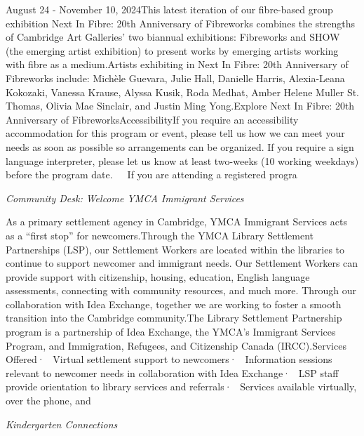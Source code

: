 \documentclass[letterpaper, 10pt]{article}
\newcommand{\subtitle}[1]{\textit{\large #1}\vspace{0.5em}}
\newcommand{\articlecontent}[1]{\small #1\vspace{1em}}
\begin{document}
\begin{multicols}{2}
{August 24 - November 10, 2024This latest iteration of our fibre-based group exhibition Next In Fibre: 20th Anniversary of Fibreworks combines the strengths of Cambridge Art Galleries’ two biannual exhibitions: Fibreworks and SHOW (the emerging artist exhibition) to present works by emerging artists working with fibre as a medium.Artists exhibiting in Next In Fibre: 20th Anniversary of Fibreworks include: Michèle Guevara, Julie Hall, Danielle Harris, Alexia-Leana Kokozaki, Vanessa Krause, Alyssa Kusik, Roda Medhat, Amber Helene Muller St. Thomas, Olivia Mae Sinclair, and Justin Ming Yong.Explore Next In Fibre: 20th Anniversary of FibreworksAccessibilityIf you require an accessibility accommodation for this program or event, please tell us how we can meet your needs as soon as possible so arrangements can be organized. If you require a sign language interpreter, please let us know at least two-weeks (10 working weekdays) before the program date.   If you are attending a registered progra
}
\vspace{10px}

\subtitle{Community Desk: Welcome YMCA Immigrant Services}

\articlecontent{

\qrcode[height=1.5cm]{https://ideaexchange.libnet.info/event/11502098}
\vspace{10px}

As a primary settlement agency in Cambridge, YMCA Immigrant Services acts as a “first stop” for newcomers.Through the YMCA Library Settlement Partnerships (LSP), our Settlement Workers are located within the libraries to continue to support newcomer and immigrant needs. Our Settlement Workers can provide support with citizenship, housing, education, English language assessments, connecting with community resources, and much more. Through our collaboration with Idea Exchange, together we are working to foster a smooth transition into the Cambridge community.The Library Settlement Partnership program is a partnership of Idea Exchange, the YMCA’s Immigrant Services Program, and Immigration, Refugees, and Citizenship Canada (IRCC).Services Offered·  Virtual settlement support to newcomers·  Information sessions relevant to newcomer needs in collaboration with Idea Exchange·  LSP staff provide orientation to library services and referrals·  Services available virtually, over the phone, and 
}
\vspace{10px}

\subtitle{Kindergarten Connections}

\articlecontent{

}
\end{multicols}
\end{document}

